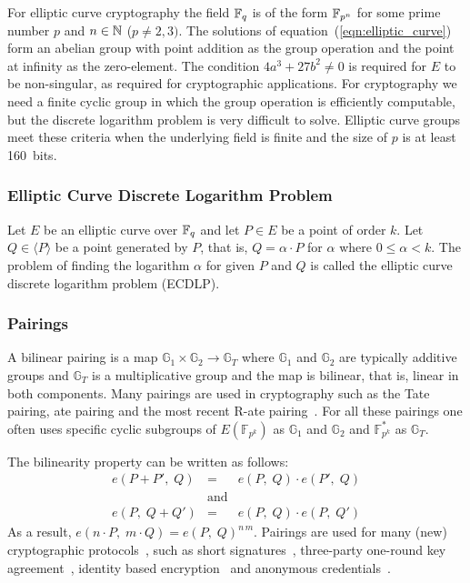 For elliptic curve cryptography the field $\mathbb{F}_{q}$ is of the form $\mathbb{F}_{p^n}$ for
some prime number $p$ and $n \in \mathbb{N}$ ($p \neq 2,3)$. The solutions of
equation~(\ref{eqn:elliptic_curve}) form an abelian group with point addition
as the group operation and the point at infinity as the zero-element. The
condition $4a^3 + 27b^2 \neq 0$ is required for $E$ to be non-singular, as
required for cryptographic applications. For cryptography we need a finite
cyclic group in which the group operation is efficiently computable, but the
discrete logarithm problem is very difficult to solve. Elliptic curve groups
meet these criteria when the underlying field is finite and the size of $p$ is
at least 160~bits.

\subsubsection{Elliptic Curve Discrete Logarithm Problem}

Let $E$ be an elliptic curve over $\mathbb{F}_{q}$ and let $P \in E$ be a point of order
$k$. Let $Q \in \langle P \rangle$ be a point generated by $P$, that is,
$Q = \alpha \cdot P$ for $\alpha$ where $0 \leq \alpha < k$. The problem of
finding the logarithm $\alpha$ for given $P$ and $Q$ is called the elliptic
curve discrete logarithm problem (ECDLP).


\subsubsection{Pairings\label{sec:pairings}}

A bilinear pairing is a map $\mathbb{G}_1 \times \mathbb{G}_2 \rightarrow
\mathbb{G}_T$ where $\mathbb{G}_1$ and $\mathbb{G}_2$ are typically additive
groups and $\mathbb G_T$ is a multiplicative group and the map is bilinear, that
is, linear in both components. Many pairings are used in cryptography such as the
Tate pairing, ate pairing and the most recent R-ate
pairing~\cite{Vercauteren09}. For all these pairings one often uses specific cyclic
subgroups of $E(\mathbb{F}_{p^k})$ as $\mathbb{G}_1$ and $\mathbb{G}_2$
and $\mathbb{F}_{p^k}^*$ as $\mathbb{G}_T$.

The bilinearity property can be written as follows:
\begin{equation*}
  \begin{array}{rcl}
    e(P + P',\; Q) & = & e(P,\; Q)\cdot e(P',\; Q) \\
     & \text{and} & \\
    e(P,\; Q + Q') & = & e(P,\; Q)\cdot e(P,\; Q')
  \end{array}
\end{equation*}
As a result, $e(n\cdot P,\; m\cdot Q) = e(P,\; Q)^{n\,m}$. Pairings are used for many
(new) cryptographic protocols~\cite{BSS05}, such as short
signatures~\cite{BonehLS04}, three-party one-round key agreement~\cite{Joux04},
identity based encryption~\cite{BonehFranklin01} and anonymous
credentials~\cite{CamenischLysyanskaya04}.

